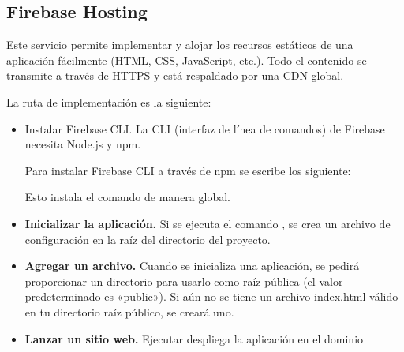 \subsection*{Firebase Hosting}
\label{\detokenize{firebase_web:firebase-hosting}}

Este servicio permite implementar y alojar los recursos estáticos de una aplicación
fácilmente (HTML, CSS, JavaScript, etc.). Todo el contenido se transmite a través
de HTTPS y está respaldado por una CDN global.

La ruta de implementación es la siguiente:

\begin{itemize}

\item{Instalar Firebase CLI.}
\label{\detokenize{firebase_web:instalar-firebase-cli}}
La CLI (interfaz de línea de comandos) de Firebase necesita Node.js y npm.

Para instalar Firebase CLI a través de npm se escribe los siguiente:

%
\begin{sphinxVerbatim}[commandchars=\\\{\}]
   
\end{sphinxVerbatim}

Esto instala el comando  de manera global.


\item\textbf{Inicializar la aplicación.}
\label{\detokenize{firebase_web:inicializar-la-aplicacion}}
Si se ejecuta el comando , se crea un archivo de configuración
 en la raíz del directorio del proyecto.


\item\textbf{Agregar un archivo.}
\label{\detokenize{firebase_web:agregar-un-archivo}}
Cuando se inicializa una aplicación, se pedirá proporcionar un directorio para
usarlo como raíz pública (el valor predeterminado es «public»). Si aún no
se tiene un archivo index.html válido en tu directorio raíz público, se creará
uno.


\item\textbf{Lanzar un sitio web.}
\label{\detokenize{firebase_web:implementar-un-sitio-web}}
Ejecutar  despliega la aplicación en el dominio

\end{itemize}